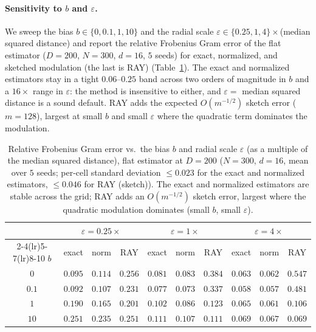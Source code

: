 \documentclass{article}
\begin{document}
\paragraph{Sensitivity to $b$ and $\varepsilon$.} We sweep the bias $b\in\{0,0.1,1,10\}$ and the radial scale $\varepsilon\in\{0.25,1,4\}\times$(median squared distance) and report the relative Frobenius Gram error of the flat estimator ($D=200$, $N=300$, $d=16$, $5$ seeds) for exact, normalized, and sketched modulation (the last is RAY) (Table~\ref{tab:sensitivity}). The exact and normalized estimators stay in a tight $0.06$--$0.25$ band across two orders of magnitude in $b$ and a $16\times$ range in $\varepsilon$: the method is insensitive to either, and $\varepsilon=$ median squared distance is a sound default. RAY adds the expected $O(m^{-1/2})$ sketch error ($m=128$), largest at small $b$ and small $\varepsilon$ where the quadratic term dominates the modulation.

\begin{table}[h]
\centering
\caption{Relative Frobenius Gram error vs.\ the bias $b$ and radial scale $\varepsilon$ (as a multiple of the median squared distance), flat estimator at $D=200$ ($N=300$, $d=16$, mean over $5$ seeds; per-cell standard deviation $\le0.023$ for the exact and normalized estimators, $\le0.046$ for RAY (sketch)). The exact and normalized estimators are stable across the grid; RAY adds an $O(m^{-1/2})$ sketch error, largest where the quadratic modulation dominates (small $b$, small $\varepsilon$).}
\label{tab:sensitivity}
\begin{tabular}{cccccccccc}
\toprule
& \multicolumn{3}{c}{$\varepsilon=0.25\times$} & \multicolumn{3}{c}{$\varepsilon=1\times$} & \multicolumn{3}{c}{$\varepsilon=4\times$} \\
\cmidrule(lr){2-4}\cmidrule(lr){5-7}\cmidrule(lr){8-10}
$b$ & exact & norm & RAY & exact & norm & RAY & exact & norm & RAY \\
\midrule
$0$    & $0.095$ & $0.114$ & $0.256$ & $0.081$ & $0.083$ & $0.384$ & $0.063$ & $0.062$ & $0.547$ \\
$0.1$  & $0.092$ & $0.107$ & $0.231$ & $0.077$ & $0.073$ & $0.337$ & $0.058$ & $0.057$ & $0.481$ \\
$1$    & $0.190$ & $0.165$ & $0.201$ & $0.102$ & $0.086$ & $0.123$ & $0.065$ & $0.061$ & $0.106$ \\
$10$   & $0.251$ & $0.235$ & $0.251$ & $0.111$ & $0.107$ & $0.111$ & $0.069$ & $0.067$ & $0.069$ \\
\bottomrule
\end{tabular}
\end{table}
\end{document}
